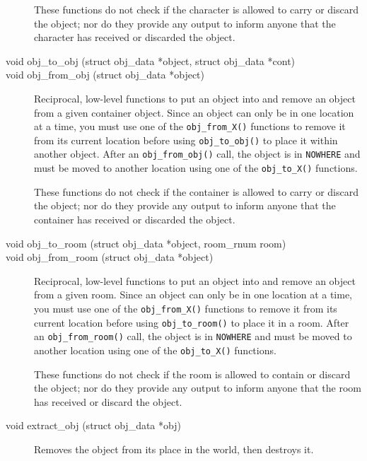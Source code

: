 \documentclass[11pt]{article}
\begin{document}
\begin{description}
\par
These functions do not check if the character is allowed to carry or discard the object; nor do they provide any output to inform anyone that the character has received or discarded the object.
\item[void obj\_to\_obj (struct obj\_data *object, struct obj\_data *cont)]
\item[void obj\_from\_obj (struct obj\_data *object)]
Reciprocal, low-level functions to put an object into and remove an object from a given container object.  Since an object can only be in one location at a time, you must use one of the \texttt{obj\_from\_X()} functions to remove it from its current location before using \texttt{obj\_to\_obj()} to place it within another object.  After an \texttt{obj\_from\_obj()} call, the object is in \texttt{NOWHERE} and must be moved to another location using one of the \texttt{obj\_to\_X()} functions.
\par
These functions do not check if the container is allowed to carry or discard the object; nor do they provide any output to inform anyone that the container has received or discarded the object.
\item[void obj\_to\_room (struct obj\_data *object, room\_rnum room)]
\item[void obj\_from\_room (struct obj\_data *object)]
Reciprocal, low-level functions to put an object into and remove an object from a given room.  Since an object can only be in one location at a time, you must use one of the \texttt{obj\_from\_X()} functions to remove it from its current location before using \texttt{obj\_to\_room()} to place it in a room.  After an \texttt{obj\_from\_room()} call, the object is in \texttt{NOWHERE} and must be moved to another location using one of the \texttt{obj\_to\_X()} functions.
\par
These functions do not check if the room is allowed to contain or discard the object; nor do they provide any output to inform anyone that the room has received or discard the object.
\item[void extract\_obj (struct obj\_data *obj)]
Removes the object from its place in the world, then destroys it.
\end{description}
\end{document}
